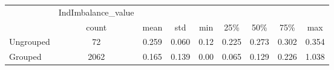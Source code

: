 \begin{tabular}{lcccccccc}
\toprule
{} & IndImbalance\_value &        &        &       &        &        &        &        \\
{} &              count &   mean &    std &   min &    25\% &    50\% &    75\% &    max \\
\midrule
Ungrouped &                 72 &  0.259 &  0.060 &  0.12 &  0.225 &  0.273 &  0.302 &  0.354 \\
Grouped   &               2062 &  0.165 &  0.139 &  0.00 &  0.065 &  0.129 &  0.226 &  1.038 \\
\bottomrule
\end{tabular}

